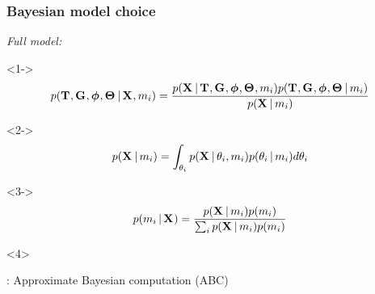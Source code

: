 
\begin{frame}[t]
    \frametitle{Bayesian model choice}
    \begin{block}{\it Full model:}
        \begin{minipage}[c][3.8cm][c]{\linewidth}
            \begin{uncoverenv}<1->
            \[
                p(
                  \divTimeMapVector,
                  \geneTreeVector,
                  \hkyModelVector,
                  \demographicParamVector
                  \given \alignmentVector, \divModel{i})
                  =
                \frac{
                    p(\alignmentVector \given
                      \divTimeMapVector,
                      \geneTreeVector,
                      \hkyModelVector,
                      \demographicParamVector,
                      \divModel{i}
                      )
                      p(
                        \divTimeMapVector,
                        \geneTreeVector,
                        \hkyModelVector,
                        \demographicParamVector
                        \given \divModel{i}
                        )
                    }{p(\alignmentVector \given \divModel{i})}
            \]\vspace{-1mm}
            \end{uncoverenv}
            \begin{uncoverenv}<2->
            \[
                p(\alignmentVector \given \divModel{i}) =
                \int_{\allParameters{i}}
                p(\alignmentVector \given \allParameters{i}, \divModel{i})
                p(\allParameters{i} \given \divModel{i})
                d\allParameters{i}
            \]\vspace{-1mm}
            \end{uncoverenv}
            \begin{uncoverenv}<3->
            \[
                p(\divModel{i} \given \alignmentVector) =
                \frac{
                    p(\alignmentVector \given \divModel{i})
                    p(\divModel{i})
                }{
                    \sum_{i} p(\alignmentVector \given \divModel{i})
                    p(\divModel{i})
                }
            \]\vspace{-1mm}
            \end{uncoverenv}
        \end{minipage}
    \end{block}
    \vspace{1mm}
    \begin{uncoverenv}<4>
        \begin{center}
            \msb: Approximate Bayesian computation (ABC)


\end{center}
\end{uncoverenv}
\end{frame}
